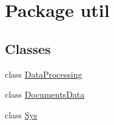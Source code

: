\hypertarget{namespaceutil}{}\section{Package util}
\label{namespaceutil}
\subsection*{Classes}
\begin{DoxyCompactItemize}
\item 
class \hyperlink{classutil_1_1DataProcessing}{Data\+Processing}
\item 
class \hyperlink{classutil_1_1DocumentsData}{Documents\+Data}
\item 
class \hyperlink{classutil_1_1Sys}{Sys}
\end{DoxyCompactItemize}
